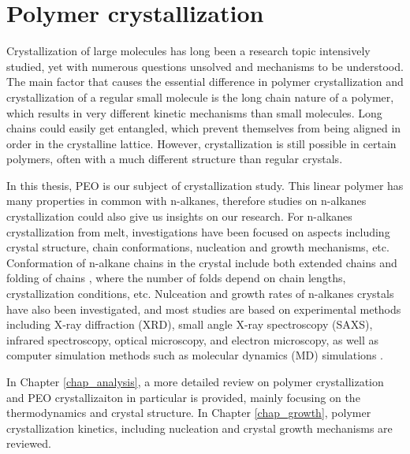 \section{Polymer crystallization}

Crystallization of large molecules has long been a research topic intensively studied, yet with numerous questions unsolved and mechanisms to be understood. The main factor that causes the essential difference in polymer crystallization and crystallization of a regular small molecule is the long chain nature of a polymer, which results in very different kinetic mechanisms than small molecules. Long chains could easily get entangled, which prevent themselves from being aligned in order in the crystalline lattice. However, crystallization is still possible in certain polymers, often with a much different structure than regular crystals.

In this thesis, PEO is our subject of crystallization study. This linear polymer has many properties in common with n-alkanes, therefore studies on n-alkanes crystallization could also give us insights on our research. For n-alkanes crystallization from melt, investigations have been focused on aspects including crystal structure, chain conformations, nucleation and growth mechanisms, etc. Conformation of n-alkane chains in the crystal include both extended chains and folding of chains \cite{Organ1996,Alamo1993}, where the number of folds depend on chain lengths, crystallization conditions, etc. Nulceation and growth rates of n-alkanes crystals have also been investigated, and most studies are based on experimental methods including X-ray diffraction (XRD), small angle X-ray spectroscopy (SAXS), infrared spectroscopy, optical microscopy, and electron microscopy, as well as computer simulation methods such as molecular dynamics (MD) simulations \cite{Anwar2013,Yamamoto2016}.

In Chapter \ref{chap_analysis}, a more detailed review on polymer crystallization and PEO crystallizaiton in particular is provided, mainly focusing on the thermodynamics and crystal structure. In Chapter \ref{chap_growth}, polymer crystallization kinetics, including nucleation and crystal growth mechanisms are reviewed.
